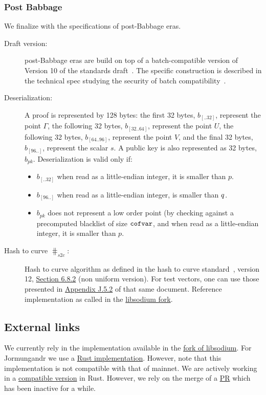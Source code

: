 \subsubsection{Post Babbage}
We finalize with the specifications of post-Babbage eras.
\begin{description}
\item[Draft version:] post-Babbage eras are build on top of a batch-compatible version of  Version 10 of the standards draft~\cite{vrfdraft10}. The specific construction is described in 
the technical spec studying the security of batch compatibility~\cite{batchspec}.
\item[Deserialization:] A \vrf proof is represented by 128 bytes: the first 32 bytes, $b_{[..32]}$, represent the point $\Gamma$, the following 32 bytes, $b_{[32..64]}$, represent the point $U$, the following 32 bytes, $b_{[64..96]}$, represent the point $V$, and the final 32 bytes, $b_{[96..]}$, represent the scalar $s$. A public key is also represented as 32 bytes, $b_{pk}$. Deserialization is valid only if:
\begin{itemize}
\item $b_{[..32]}$ when read as a little-endian integer, it is smaller than $p$.
\item $b_{[96..]}$ when read as a little-endian integer, is smaller than $q$.
\item $b_{pk}$ does not represent a low order point (by checking against a precomputed blacklist of size $\texttt{cofvar}$, and when read as a little-endian integer, it is smaller than $p$.
\end{itemize}
\item[Hash to curve $\hash_{s2c}$:] Hash to curve algorithm 
as defined in the hash to curve standard~\cite{h2cdraft13}, version 12, \href{https://datatracker.ietf.org/doc/html/draft-irtf-cfrg-hash-to-curve-12#section-6.8.2}{Section 6.8.2} (non uniform version). For test vectors, one can use those presented in \href{https://datatracker.ietf.org/doc/html/draft-irtf-cfrg-hash-to-curve-13#appendix-J.5.2}{Appendix J.5.2} of that same document. Reference implementation as called in the \href{https://github.com/input-output-hk/libsodium/blob/iquerejeta/ECVRF-EDWARDS25519-SHA512-TAI/src/libsodium/crypto_vrf/ietfdraft10/convert.c#L88}{libsodium fork}.
\end{description}
\subsection{External links}
We currently rely in the implementation available in the \href{https://github.com/input-output-hk/libsodium/tree/iquerejeta/ECVRF-EDWARDS25519-SHA512-TAI/src/libsodium/crypto_vrf}{fork of libsodium}. For Jormungandr we use a \href{https://github.com/input-output-hk/chain-libs/tree/master/chain-crypto/src/algorithms/vrf}{Rust implementation}. However, note that this implementation is not compatible with that of mainnet. We are actively working in a \href{https://github.com/input-output-hk/vrf}{compatible version} in Rust. However, we rely on the merge of a \href{https://github.com/dalek-cryptography/curve25519-dalek/pull/377}{PR} which has been inactive for a while. 
